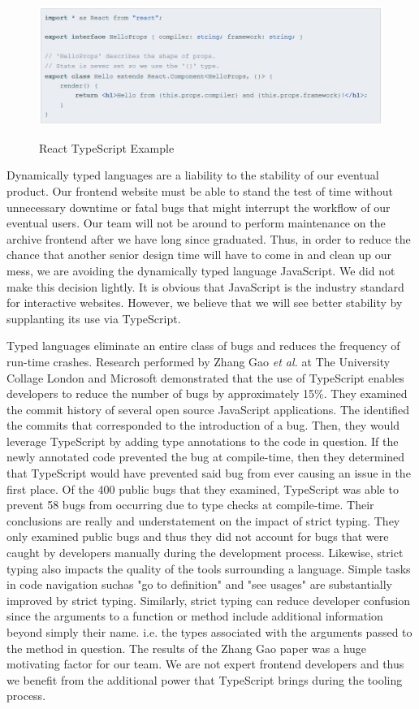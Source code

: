 \documentclass[12pt]{report}
\begin{document}
\begin{figure}[h]
	\centering
	\caption{React TypeScript Example}
	\includegraphics[scale=0.5]{react_typescript_example}
	\label{fig:reacttypescriptexample}
\end{figure}

Dynamically typed languages are a liability to the stability of our eventual product. Our frontend website must be able to stand the test of time without unnecessary downtime or fatal bugs that might interrupt the workflow of our eventual users. Our team will not be around to perform maintenance on the archive frontend after we have long since graduated. Thus, in order to reduce the chance that another senior design time will have to come in and clean up our mess, we are avoiding the dynamically typed language JavaScript. We did not make this decision lightly. It is obvious that JavaScript is the industry standard for interactive websites. However, we believe that we will see better stability by supplanting its use via TypeScript.

Typed languages eliminate an entire class of bugs and reduces the frequency of run-time crashes. Research performed by Zhang Gao \textit{et al.} at The University Collage London and Microsoft demonstrated that the use of TypeScript enables developers to reduce the number of bugs by approximately 15\%.\cite{typescriptpaper} They examined the commit history of several open source JavaScript applications. The identified the commits that corresponded to the introduction of a bug. Then, they would leverage TypeScript by adding type annotations to the code in question. If the newly annotated code prevented the bug at compile-time, then they determined that TypeScript would have prevented said bug from ever causing an issue in the first place. Of the 400 public bugs that they examined, TypeScript was able to prevent 58 bugs from occurring due to type checks at compile-time. Their conclusions are really and understatement on the impact of strict typing. They only examined public bugs and thus they did not account for bugs that were caught by developers manually during the development process. Likewise, strict typing also impacts the quality of the tools surrounding a language. Simple tasks in code navigation suchas "go to definition" and "see usages" are substantially improved by strict typing. Similarly, strict typing can reduce developer confusion since the arguments to a function or method include additional information beyond simply their name. i.e. the types associated with the arguments passed to the method in question. The results of the Zhang Gao paper was a huge motivating factor for our team. We are not expert frontend developers and thus we benefit from the additional power that TypeScript brings during the tooling process.
\end{document}
